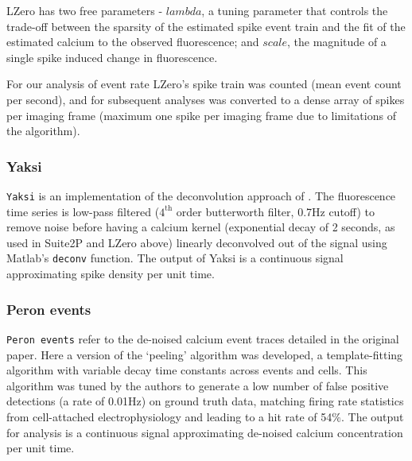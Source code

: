 \documentclass[a4paper,11pt]{article}
\begin{document}
LZero has two free parameters - $lambda$, a tuning parameter that controls the trade-off between the sparsity of the estimated spike event train and the fit of the estimated calcium to the observed fluorescence; and $scale$, the magnitude of a single spike induced change in fluorescence.

For our analysis of event rate LZero's spike train was counted (mean event count per second), and for subsequent analyses was converted to a dense array of spikes per imaging frame (maximum one spike per imaging frame due to limitations of the algorithm).




\subsubsection*{Yaksi}
\texttt{Yaksi} is an implementation of the deconvolution approach of \citet{Yaksi2006-ic}. The fluorescence time series is low-pass filtered ($4^{\text{th}}$ order butterworth filter, 0.7Hz cutoff) to remove noise before having a calcium kernel (exponential decay of 2 seconds, as used in Suite2P and LZero above) linearly deconvolved out of the signal using Matlab's {\tt deconv} function. The output of Yaksi is a continuous signal approximating spike density per unit time.

\subsubsection*{Peron events}
\texttt{Peron events} refer to the de-noised calcium event traces detailed in the original \cite{Peron2015-kd} paper. Here a version of the `peeling' algorithm \citep{Lutcke2013-wu} was developed, a template-fitting algorithm with variable decay time constants across events and cells. This algorithm was tuned by the authors to generate a low number of false positive detections (a rate of 0.01Hz) on ground truth data, matching firing rate statistics from cell-attached electrophysiology and leading to a hit rate of 54$\%$. The output for analysis is a continuous signal approximating de-noised calcium concentration per unit time.
\end{document}
